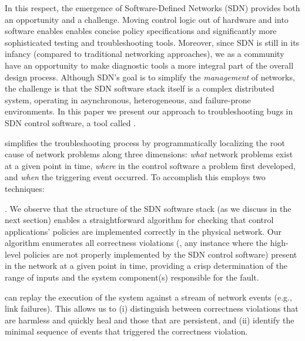 {In this respect, the emergence of Software-Defined
Networks (SDN) provides both an opportunity and a challenge. Moving control logic out of hardware and into software
enables enables concise policy specifications and significantly more sophisticated testing and troubleshooting tools. Moreover, since SDN
is still in its infancy (compared to traditional networking approaches), we as a community have an opportunity to make diagnostic tools
a more integral part of the overall design process. Although SDN's goal is to simplify the
{\em management} of networks, the challenge is that the SDN software stack itself is a complex distributed system,
operating in asynchronous, heterogeneous, and failure-prone environments.
In this paper we present our approach to troubleshooting bugs in SDN control
software, a tool called \projectname{}.

\projectname{} simplifies the troubleshooting process by programmatically localizing the root cause
of network problems along three dimensions: {\it what} network problems exist at a
given point in time, {\it where} in the control software a problem first developed, and
{\it when} the triggering event occurred. To accomplish this
\projectname{} employs two techniques:

. We observe that the structure of the
SDN software stack (as we discuss in the next section) enables a straightforward algorithm for
checking that control applications' policies are implemented correctly in
the physical network. Our algorithm enumerates all correctness violations
(\ie{}, any instance where the high-level policies are not properly
implemented by the SDN control software) present in the network at a given point in
time, providing a crisp determination of the range of inputs
and the system component(s) responsible for the fault.

 \projectname{} can replay the execution of the
system against
a stream of network events (e.g., link failures). This allows us to (i)
distinguish between correctness violations that are harmless and quickly heal and
those that are persistent, and (ii) identify the minimal sequence of events that triggered
the correctness violation.


}
